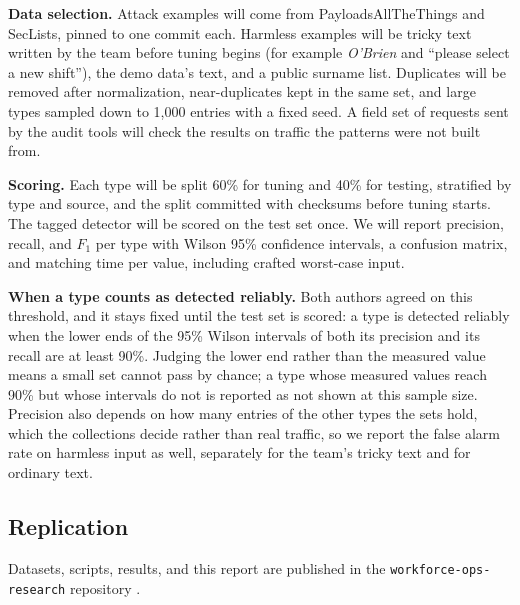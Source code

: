 \textbf{Data selection.} Attack examples will come from PayloadsAllTheThings and SecLists, pinned to one commit each. Harmless examples will be tricky text written by the team before tuning begins (for example \emph{O'Brien} and ``please select a new shift''), the demo data's text, and a public surname list. Duplicates will be removed after normalization, near-duplicates kept in the same set, and large types sampled down to 1,000 entries with a fixed seed. A field set of requests sent by the audit tools will check the results on traffic the patterns were not built from. 

\textbf{Scoring.} Each type will be split 60\% for tuning and 40\% for testing, stratified by type and source, and the split committed with checksums before tuning starts. The tagged detector will be scored on the test set once. We will report precision, recall, and $F_1$ per type with Wilson 95\% confidence intervals, a confusion matrix, and matching time per value, including crafted worst-case input. 

\textbf{When a type counts as detected reliably.} Both authors agreed on this threshold, and it stays fixed until the test set is scored: a type is detected reliably when the lower ends of the 95\% Wilson intervals of both its precision and its recall are at least 90\%. Judging the lower end rather than the measured value means a small set cannot pass by chance; a type whose measured values reach 90\% but whose intervals do not is reported as not shown at this sample size. Precision also depends on how many entries of the other types the sets hold, which the collections decide rather than real traffic, so we report the false alarm rate on harmless input as well, separately for the team's tricky text and for ordinary text.

\subsection{Replication}
Datasets, scripts, results, and this report are published in the \texttt{workforce-ops-research} repository .
